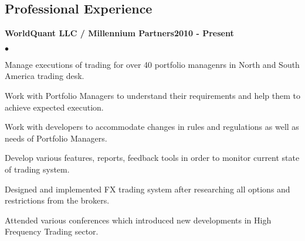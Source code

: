 \documentclass[margin,line]{res}
\newenvironment{list2}{
  \begin{list}{$\bullet$}{%
      \setlength{\itemsep}{0.05in}
      \setlength{\parsep}{0in} \setlength{\parskip}{0in}
      \setlength{\topsep}{0in} \setlength{\partopsep}{0in} 
      \setlength{\leftmargin}{0.2in}}}{\end{list}}
\begin{document}
\begin{resume}
\section{\sc Professional Experience}
{\bf WorldQuant LLC / Millennium Partners}\hfill {\bf 2010 - Present}\\
\begin{list2}
\item Manage executions of trading for over 40 portfolio managenrs in North and South America trading desk.
\item Work with Portfolio Managers to understand their requirements and help them to achieve expected execution.
\item Work with developers to accommodate changes in rules and regulations as well as needs of Portfolio Managers.
\item Develop various features, reports, feedback tools in order to monitor current state of trading system.
\item Designed and implemented FX trading system after researching all options and restrictions from the brokers.
\item Attended various conferences which introduced new developments in High Frequency Trading sector.
\end{list2}


\end{resume}
\end{document}
